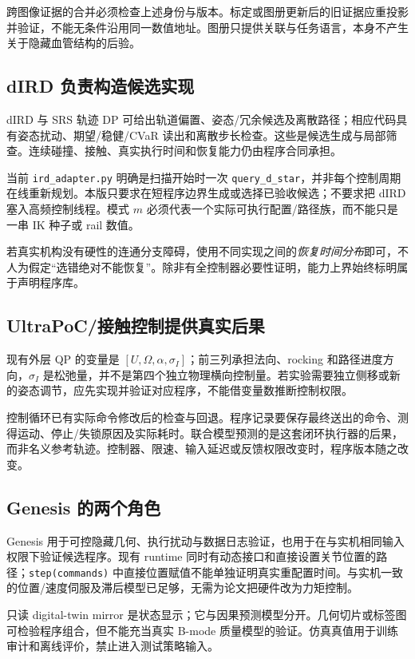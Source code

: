 \documentclass[11pt,a4paper,fontset=fandol]{ctexart}
\theoremstyle{definition}\newtheorem{definition}[theorem]{定义}
\theoremstyle{remark}\newtheorem{remark}[theorem]{说明}
\numberwithin{equation}{section}
\begin{document}
跨图像证据的合并必须检查上述身份与版本。标定或图册更新后的旧证据应重投影并验证，不能无条件沿用同一数值地址。图册只提供关联与任务语言，本身不产生关于隐藏血管结构的后验。

\subsection{dIRD 负责构造候选实现}
dIRD 与 SRS 轨迹 DP 可给出轨道偏置、姿态/冗余候选及离散路径；相应代码具有姿态扰动、期望/稳健/CVaR 读出和离散步长检查\cite{codedird}。这些是候选生成与局部筛查。连续碰撞、接触、真实执行时间和恢复能力仍由程序合同承担。

当前 \texttt{ird\_adapter.py} 明确是扫描开始时一次 \texttt{query\_d\_star}，并非每个控制周期在线重新规划\cite{codeird}。本版只要求在短程序边界生成或选择已验收候选；不要求把 dIRD 塞入高频控制线程。模式 $m$ 必须代表一个实际可执行配置/路径族，而不能只是一串 IK 种子或 rail 数值。

若真实机构没有硬性的连通分支障碍，使用不同实现之间的\emph{恢复时间分布}即可，不人为假定“选错绝对不能恢复”。除非有全控制器必要性证明，能力上界始终标明属于声明程序库。

\subsection{UltraPoC/接触控制提供真实后果}
现有外层 QP 的变量是 $[U,\Omega,\alpha,\sigma_I]$；前三列承担法向、rocking 和路径进度方向，$\sigma_I$ 是松弛量，并不是第四个独立物理横向控制量\cite{codeqp}。若实验需要独立侧移或新的姿态调节，应先实现并验证对应程序，不能借变量数推断控制权限。

控制循环已有实际命令修改后的检查与回退\cite{codeloop}。程序记录要保存最终送出的命令、测得运动、停止/失锁原因及实际耗时。联合模型预测的是这套闭环执行器的后果，而非名义参考轨迹。控制器、限速、输入延迟或反馈权限改变时，程序版本随之改变。

\subsection{Genesis 的两个角色}
Genesis 用于可控隐藏几何、执行扰动与数据日志验证，也用于在与实机相同输入权限下验证候选程序。现有 runtime 同时有动态接口和直接设置关节位置的路径；\texttt{step(commands)} 中直接位置赋值不能单独证明真实重配置时间\cite{coderuntime}。与实机一致的位置/速度伺服及滞后模型已足够，无需为论文把硬件改为力矩控制。

只读 digital-twin mirror 是状态显示；它与因果预测模型分开。几何切片或标签图可检验程序组合，但不能充当真实 B-mode 质量模型的验证。仿真真值用于训练审计和离线评价，禁止进入测试策略输入。
\end{document}
